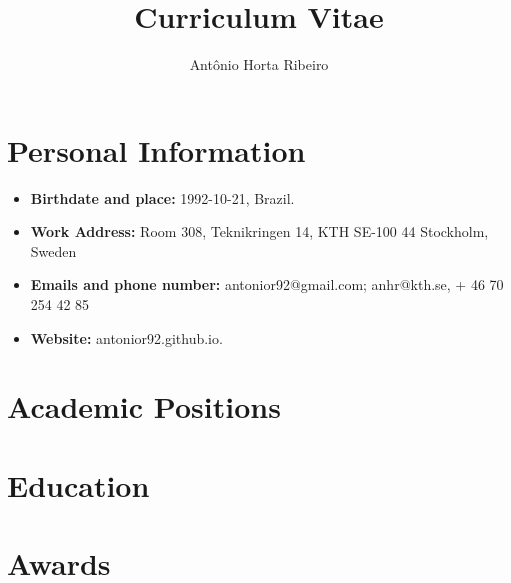 \documentclass[10pt,A4]{article} %
\title{Curriculum Vitae}
\author{Ant\^onio Horta Ribeiro}
\begin{document}
\maketitle
\small 
\section {Personal Information} 

\begin{itemize}
\item {\bf Birthdate and place:} 1992-10-21, Brazil.
    \item {\bf Work Address:} Room  308, Teknikringen 14, KTH SE-100 44 Stockholm, Sweden
    \item {\bf Emails and phone number:} antonior92@gmail.com; anhr@kth.se,  + 46 70 254 42 85 \item
      {\bf Website:} antonior92.github.io.
\end{itemize}

\section{Academic Positions} %

  
\section{Education} %

  

\section{Awards}

  
\end{document}
